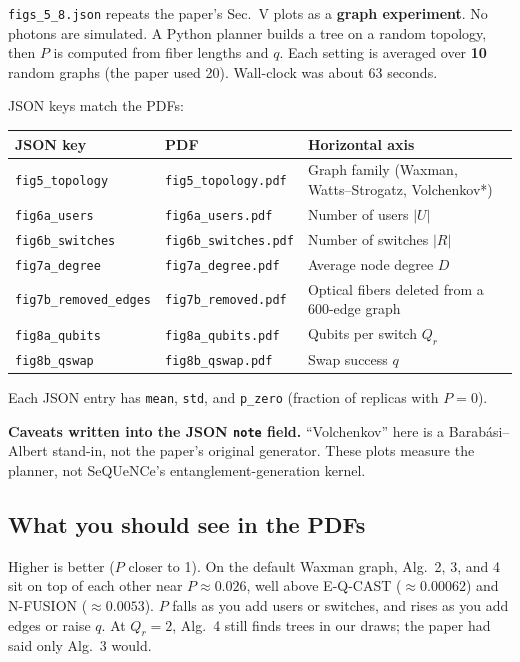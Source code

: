\documentclass[11pt]{article}
\begin{document}
\texttt{figs\_5\_8.json} repeats the paper's Sec.~V plots as a \textbf{graph experiment}.
No photons are simulated.
A Python planner builds a tree on a random topology, then $P$ is computed from fiber lengths and $q$.
Each setting is averaged over \textbf{10} random graphs (the paper used 20).
Wall-clock was about 63 seconds.

JSON keys match the PDFs:

\begin{center}
\begin{tabular}{@{}lll@{}}
\toprule
JSON key & PDF & Horizontal axis \\
\midrule
\texttt{fig5\_topology} & \texttt{fig5\_topology.pdf} & Graph family (Waxman, Watts--Strogatz, Volchenkov*) \\
\texttt{fig6a\_users} & \texttt{fig6a\_users.pdf} & Number of users $|U|$ \\
\texttt{fig6b\_switches} & \texttt{fig6b\_switches.pdf} & Number of switches $|R|$ \\
\texttt{fig7a\_degree} & \texttt{fig7a\_degree.pdf} & Average node degree $D$ \\
\texttt{fig7b\_removed\_edges} & \texttt{fig7b\_removed.pdf} & Optical fibers deleted from a 600-edge graph \\
\texttt{fig8a\_qubits} & \texttt{fig8a\_qubits.pdf} & Qubits per switch $Q_r$ \\
\texttt{fig8b\_qswap} & \texttt{fig8b\_qswap.pdf} & Swap success $q$ \\
\bottomrule
\end{tabular}
\end{center}

Each JSON entry has \texttt{mean}, \texttt{std}, and \texttt{p\_zero} (fraction of replicas with $P=0$).

\textbf{Caveats written into the JSON \texttt{note} field.}
``Volchenkov'' here is a Barab\'asi--Albert stand-in, not the paper's original generator.
These plots measure the planner, not SeQUeNCe's entanglement-generation kernel.

\subsection{What you should see in the PDFs}

Higher is better ($P$ closer to 1).
On the default Waxman graph, Alg.~2, 3, and 4 sit on top of each other near $P\approx 0.026$, well above E-Q-CAST ($\approx 0.00062$) and N-FUSION ($\approx 0.0053$).
$P$ falls as you add users or switches, and rises as you add edges or raise $q$.
At $Q_r=2$, Alg.~4 still finds trees in our draws; the paper had said only Alg.~3 would.
\end{document}
